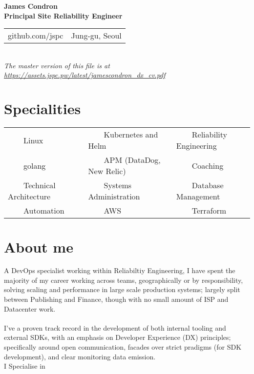 \documentclass[11pt,a4paper,sans]{article}
\newcommand{\tabitem}{~~\llap{\textbullet}~~}
\begin{document}
\begin{center}
  {\huge\textbf{James Condron}}\\
  \textbf{Principal Site Reliability Engineer} \\

  \begin{tabular}{rl}
    github.com/jspc &  Jung-gu, Seoul
  \end{tabular} \\

  {\footnotesize\textit{The master version of this file is at \url{https://assets.jspc.pw/latest/jamescondron_dx_cv.pdf}}}
\end{center}

\section{Specialities}
\begin{tabular}{lll}
\tabitem Linux & \tabitem Kubernetes and Helm & \tabitem Reliability Engineering \\
\tabitem golang & \tabitem APM (DataDog, New Relic) & \tabitem Coaching \\
\tabitem Technical Architecture & \tabitem Systems Administration & \tabitem Database Management \\
\tabitem Automation & \tabitem AWS & \tabitem Terraform  \\
\end{tabular}

\section{About me}
A DevOps specialist working within Reliabiltiy Engineering, I have spent the majority of my career working across teams, geographically or by responsibility, solving scaling and performance in large scale production systems; largely split between Publishing and Finance, though with no small amount of ISP and Datacenter work. \\
\\
I've a proven track record in the development of both internal tooling and external SDKs, with an emphasis on Developer Experience (DX) principles; specifically around open communication, facades over strict pradigms (for SDK development), and clear monitoring data emission.
\\
I Specialise in
\end{document}
